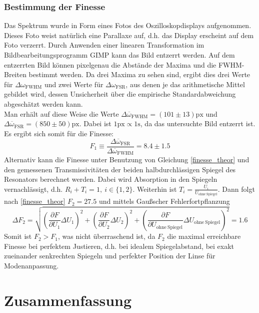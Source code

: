 \documentclass[11pt,a4paper,oneside]{scrartcl}
\begin{document}
\subsubsection{Bestimmung der Finesse}
Das Spektrum wurde in Form eines Fotos des Oszilloskopdisplays aufgenommen. Dieses Foto weist natürlich eine Parallaxe auf, d.h. das Display erscheint auf dem Foto verzerrt. Durch Anwenden einer linearen Transformation im Bildbearbeitungsprogramm GIMP kann das Bild entzerrt werden. Auf dem entzerrten Bild können pixelgenau die Abstände der Maxima und die FWHM-Breiten bestimmt werden. Da drei Maxima zu sehen sind, ergibt dies drei Werte für $\Delta\omega_{\mathrm{FWHM}}$ und zwei Werte für $\Delta\omega_{\mathrm{FSR}}$, aus denen je das arithmetische Mittel gebildet wird, dessen Unsicherheit über die empirische Standardabweichung abgeschätzt werden kann.\\
Man erhält auf diese Weise die Werte $\Delta\overline\omega_{\mathrm{FWHM}}=(101\pm13)\mathrm{px}$ und $\Delta\overline\omega_{\mathrm{FSR}}=(850\pm50)\mathrm{px}$. Dabei ist $1\mathrm{px}\propto 1\mathrm s$, da das untersuchte Bild entzerrt ist. \\
Es ergibt sich somit für die Finesse:
\begin{equation}
F_1\equiv \frac{\Delta\overline\omega_{\mathrm{FSR}}}{\Delta\overline\omega_{\mathrm{FWHM}}}=8.4\pm1.5
\end{equation}
Alternativ kann die Finesse unter Benutzung von Gleichung \ref{finesse_theor} und den gemessenen Transmissivitäten der beiden halbdurchlässigen Spiegel des Resonators berechnet werden. Dabei wird Absorption in den Spiegeln vernachlässigt, d.h. $R_i+T_i=1,\ i\in\{1,2\}$. Weiterhin ist $T_i=\frac{U_i}{U_{\mathrm{ohne}\ \mathrm{Spiegel}}}$. Dann folgt nach \ref{finesse_theor} $F_2=27.5$ und mittels Gaußscher Fehlerfortpflanzung \begin{equation}
\Delta F_2 = \sqrt{\left(\frac{\partial F}{\partial U_1}\Delta U_1\right)^2+\left(\frac{\partial F}{\partial U_2}\Delta U_2\right)^2+\left(\frac{\partial F}{\partial U_{\mathrm{ohne}\ \mathrm{Spiegel}}}\Delta U_{\mathrm{ohne}\ \mathrm{Spiegel}}\right)^2}=1.6
\end{equation}
Somit ist $F_2>F_1$, was nicht überraschend ist, da $F_2$ die maximal erreichbare Finesse bei perfektem Justieren, d.h. bei idealem Spiegelabstand, bei exakt zueinander senkrechten Spiegeln und perfekter Position der Linse für Modenanpassung.
\section{Zusammenfassung}
\newpage
\end{document}
